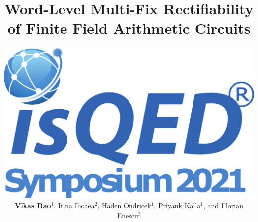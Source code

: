 \documentclass[xcolor=dvipsnames]{beamer}
\title[]{Word-Level Multi-Fix Rectifiability of Finite Field Arithmetic Circuits}
\author[]{
\includegraphics[scale=0.10]{ISQED_logo.pdf}\\
 {\bf Vikas Rao$^1$}, Irina Ilioaea$^2$, Haden Ondricek$^1$, 
Priyank Kalla$^1$,  and Florian Enescu$^3$}
\institute[]{
$^1$Electrical \& Computer Engineering, University of Utah\\
$^2$Department of Mathematics, Louisiana State University Shreveport\\
$^3$Mathematics \& Statistics, Georgia State University
}
\begin{document}
\begin{frame}[plain]
  \titlepage
\end{frame}










% 


\end{document}
